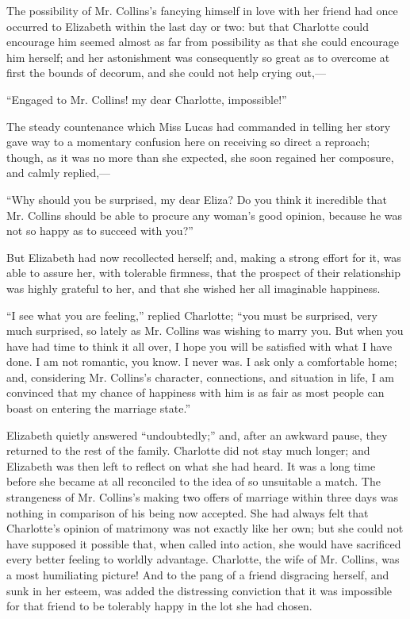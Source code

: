 The possibility of Mr. Collins's fancying himself in love with her friend had once occurred to Elizabeth within the last day or two: but that Charlotte could encourage him seemed almost as far from possibility as that she could encourage him herself; and her astonishment was consequently so great as to overcome at first the bounds of decorum, and she could not help crying out,---

``Engaged to Mr. Collins! my dear Charlotte, impossible!''

The steady countenance which Miss Lucas had commanded in telling her story gave way to a momentary confusion here on receiving so direct a reproach; though, as it was no more than she expected, she soon regained her composure, and calmly replied,---

``Why should you be surprised, my dear Eliza? Do you think it incredible that Mr. Collins should be able to procure any woman's good opinion, because he was not so happy as to succeed with you?''

But Elizabeth had now recollected herself; and, making a strong effort for it, was able to assure her, with tolerable firmness, that the prospect of their relationship was highly grateful to her, and that she wished her all imaginable happiness.

``I see what you are feeling,'' replied Charlotte; ``you must be surprised, very much surprised, so lately as Mr. Collins was wishing to marry you. But when you have had time to think it all over, I hope you will be satisfied with what I have done. I am not romantic, you know. I never was. I ask only a comfortable home; and, considering Mr. Collins's character, connections, and situation in life, I am convinced that my chance of happiness with him is as fair as most people can boast on entering the marriage state.''

Elizabeth quietly answered ``undoubtedly;'' and, after an awkward pause, they returned to the rest of the family. Charlotte did not stay much longer; and Elizabeth was then left to reflect on what she had heard. It was a long time before she became at all reconciled to the idea of so unsuitable a match. The strangeness of Mr. Collins's making two offers of marriage within three days was nothing in comparison of his being now accepted. She had always felt that Charlotte's opinion of matrimony was not exactly like her own; but she could not have supposed it possible that, when called into action, she would have sacrificed every better feeling to worldly advantage. Charlotte, the wife of Mr. Collins, was a most humiliating picture! And to the pang of a friend disgracing herself, and sunk in her esteem, was added the distressing conviction that it was impossible for that friend to be tolerably happy in the lot she had chosen.



